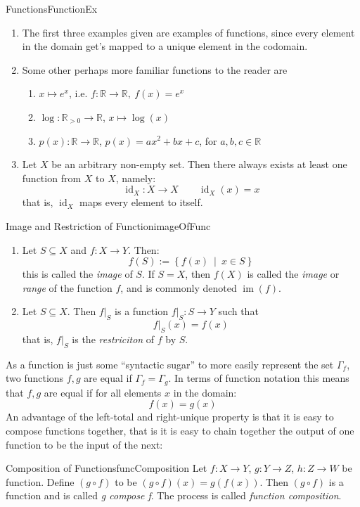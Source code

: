 \documentclass{book}
\newcommand{\R}{{\mathbb{R}}}
\newcommand{\id}{{\operatorname{id}}}
\newcommand{\im}{{\operatorname{im}}}
\newcommand{\sse}{\subseteq}
\newcommand{\rw}{\rightarrow}
\newcommand{\set}[2]{\left\{#1 \ \middle|\ #2\right\}}
\begin{document}
\begin{example}{Functions}{FunctionEx}
	\begin{enumerate}
		\item The first three examples given are examples of functions, since every element in the domain
			get's mapped to a unique element in the codomain.
		\item Some other perhaps more familiar functions to the reader are
			\begin{enumerate}
				\item $x \mapsto e^x$, i.e. $f: \R \rw \R,\ f(x) = e^x$
				\item $\log: \R_{>0} \rw \R$, $x \mapsto \log(x)$
				\item $p(x): \R \rw \R$, $p(x) = ax^2 + bx + c$, for $a,b,c \in \R$
			\end{enumerate}
		\item Let $X$ be an arbitrary non-empty set. Then there always exists at least one function from $X$
			to $X$, namely:
			\[
				\id_X: X \to X \qquad \id_X(x) = x
			\]
			that is, $\id_X$ maps every element to itself.
	\end{enumerate}
\end{example}

\begin{defn}{Image and Restriction of Function}{imageOfFunc}
	\begin{enumerate}
		\item 	Let $S \sse X$ and $f: X \to Y$. Then:
	\[
		f(S) := \set{f(x)}{x \in S}
	\]
		this is called the \emph{image} of $S$. If $S = X$, then $f(X)$ is called the \emph{image} or \emph{range}
		of the function $f$, and is commonly denoted $\im(f)$.
	\item Let $S \sse X$. Then $f|_S$ is a function $f|_S: S \to Y$ such that
		\[
			f|_S(x) = f(x)
		\]
		that is, $f|_S$ is the \emph{restriciton} of $f$ by $S$.
	\end{enumerate}
\end{defn}

As a function is just some ``syntactic sugar'' to more easily represent the set $\Gamma_f$, two functions
$f,g$ are equal if $\Gamma_f = \Gamma_g$. In terms of function notation this means that $f,g$ are equal if for
all elements $x$ in the domain:
\[
	f(x) = g(x)
\]
An advantage of the left-total and right-unique property is that it is easy to compose functions together,
that is it is easy to chain together the output of one function to be the input of the next:

\begin{prop}{Composition of Functions}{funcComposition}
	Let $f: X \rw Y$, $g: Y \rw Z$, $h: Z \rw W$ be function. Define $(g\circ f)$ to be $(g\circ f)(x) =
	g(f(x))$. Then $(g\circ f)$ is a function and is called \emph{g compose f}. The process is called
	\emph{function composition}.
\end{prop}
\end{document}
